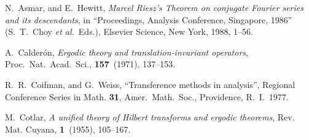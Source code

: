 \begin{thebibliography}{Dillo 83}





  N.\ Asmar, and E.\ Hewitt, 
{\em Marcel Riesz's Theorem on conjugate 
Fourier series and its descendants}, in ``Proceedings, 
Analysis Conference, Singapore, 1986'' 
(S.\ T.\ Choy {\it et al.}\ Eds.), 
Elsevier Science, New York, 1988, 1--56.









  A.\ Calder\'{o}n, 
{\em Ergodic theory and translation-invariant operators}, Proc.\ Nat.\ Acad.\ Sci., {\bf 157}\ (1971), 137--153.


  R.\ R.\ Coifman, and G.\ Weiss,
``Transference methods in analysis'', Regional Conference 
Series in Math. {\bf 31}, Amer.\ Math.\ Soc., Providence, R.\ I.\, 1977.

  M.\  Cotlar,  
{\em A unified theory of Hilbert transforms and ergodic theorems}, 
Rev. Mat. Cuyana, {\bf 1}\ (1955), 105--167.


\end{thebibliography}
